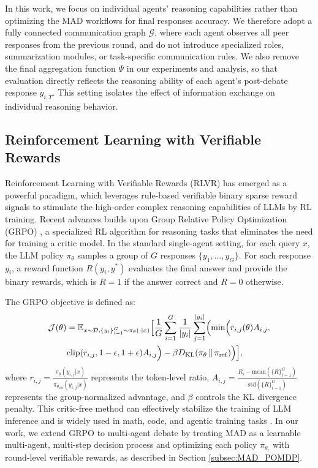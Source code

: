 \documentclass{article}
\theoremstyle{plain}
\theoremstyle{definition}
\theoremstyle{remark}
\begin{document}
In this work, we focus on individual agents' reasoning capabilities rather than optimizing the MAD workflows for final responses accuracy. We therefore adopt a fully connected communication graph $\mathcal{G}$, where each agent observes all peer responses from the previous round, and do not introduce specialized roles, summarization modules, or task-specific communication rules. We also remove the final aggregation function $\Psi$ in our experiments and analysis, so that evaluation directly reflects the reasoning ability of each agent's post-debate response $y_{i,T}$. This setting isolates the effect of information exchange on individual reasoning behavior. 


\subsection{Reinforcement Learning with Verifiable Rewards}
Reinforcement Learning with Verifiable Rewards (RLVR) has emerged as a powerful paradigm, which leverages rule-based verifiable binary sparse reward signals to stimulate the high-order complex reasoning capabilities of LLMs by RL training. Recent advances builds upon Group Relative Policy Optimization (GRPO) \cite{shao2024deepseekmath}, a specialized RL algorithm for reasoning tasks that eliminates the need for training a critic model. In the standard single-agent setting, for each query $x$, the LLM policy $\pi_\theta$ samples a group of $G$ responses $\{y_1, \dots, y_G\}$. For each response $y_i$, a reward function $R(y_i, y^*)$ evaluates the final answer and provide the binary rewards, which is $R=1$ if the answer correct and $R=0$ otherwise. 

The GRPO objective is defined as:
{\small
\begin{align}
\nonumber & \mathcal{J}(\theta)
= \mathbb{E}_{x \sim \mathcal{D}, \{y_i\}_{i=1}^G \sim \pi_\theta(\cdot \mid x)}
\Bigl[
\frac{1}{G}\sum_{i=1}^G \frac{1}{\lvert y_i\rvert}\sum_{j=1}^{\lvert y_i\rvert}
\Bigl(\min\Bigl(
r_{i,j}(\theta)A_{i,j}, \\
&\qquad \operatorname{clip}(r_{i,j},1-\epsilon,1+\epsilon)A_{i,j}
\Bigr)
-\beta D_{\mathrm{KL}}(\pi_\theta \,\|\, \pi_{\mathrm{ref}})
\Bigr)
\Bigr],
\end{align}
}
where $r_{i,j} = \frac{\pi_\theta(y_{i,j}|x)}{\pi_{\theta_{old}}(y_{i,j}|x)}$ represents the token-level ratio, $A_{i,j} = \frac{R_{i} - \text{mean}(\{R\}_{i=1}^G)}{\text{std}(\{R\}_{i=1}^G)}$ represents the group-normalized advantage, and $\beta$ controls the KL divergence penalty. This critic-free method can effectively stabilize the training of LLM inference and is widely used in math, code, and agentic training tasks \cite{yu2025dapo,wei2025swe,jin2025search}. In our work, we extend GRPO to multi-agent debate by treating MAD as a learnable multi-agent, multi-step decision process and optimizing each policy $\pi_{\theta_i}$ with round-level verifiable rewards, as described in Section \ref{subsec:MAD_POMDP}. 
\end{document}
